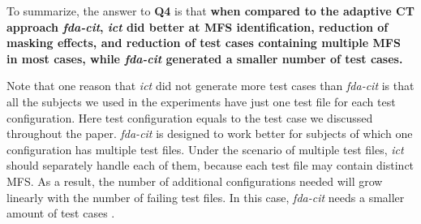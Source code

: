 \documentclass[journal,12pt,onecolumn,draftclsnofoot,]{IEEEtran}
\begin{document}
To summarize, the answer to \textbf{Q4} is that
{\color{red} \textbf{when compared to the adaptive CT approach \emph{fda-cit}, \emph{ict} did better at MFS identification, reduction of masking effects, and reduction of test cases containing multiple MFS in most cases, while \emph{fda-cit} generated a smaller number of test cases.}}


Note that one reason that \emph{ict} did not generate more test cases than \emph{fda-cit} is that all the subjects we used in the experiments have just one test file for each test configuration. Here test configuration equals to the test case we discussed throughout the paper.    \emph{fda-cit} is designed to work better for subjects of which one configuration has multiple test files. Under the scenario of multiple test files, \emph{ict} should separately handle each of them, because each test file may contain distinct MFS. As a result, the number of additional configurations needed will grow linearly with the number of failing test files. In this case, \emph{fda-cit} needs a smaller amount of test cases \cite{yilmaz2013reducing}.


%
%
%
%
%
\end{document}
